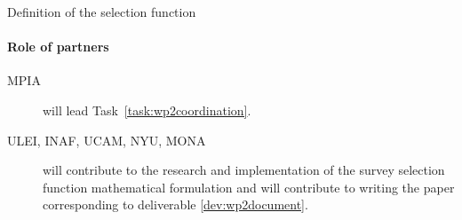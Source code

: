 \begin{workpackage}{Definition of the selection function}
\begin{wpdescription}
    \paragraph{Role of partners}
    \begin{description}
      \item[MPIA] will lead Task~\ref{task:wp2coordination}.
      \item[ULEI, INAF, UCAM, NYU, MONA] will contribute to the research and implementation of the survey selection function mathematical formulation and will contribute to writing the paper corresponding to deliverable \ref{dev:wp2document}.
    \end{description}
  \end{wpdescription}

  \begin{wpdeliverables}
    \label{dev:wp2document}
  \end{wpdeliverables}

\end{workpackage}


